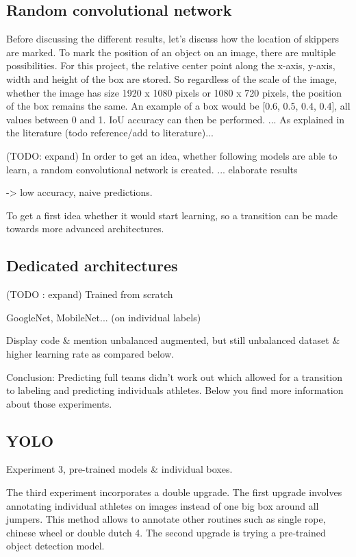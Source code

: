 \subsection{Random convolutional network}


Before discussing the different results, let's discuss how the location of skippers are marked. To mark the position of an object on an image, there are multiple possibilities.
For this project, the relative center point along the x-axis, y-axis, width and height of the box are stored. So regardless of the scale of the image, whether the image has size 1920 x 1080 pixels or 1080 x 720 pixels, the position of the box remains the same.
An example of a box would be [0.6, 0.5, 0.4, 0.4], all values between 0 and 1. IoU accuracy can then be performed.
... As explained in the literature (todo reference/add to literature)...

(TODO: expand)
In order to get an idea, whether following models are able to learn, a random convolutional network is created.
... elaborate results %

-> low accuracy, naive predictions.

To get a first idea whether it would start learning, so a transition can be made towards more advanced architectures.

\subsection{Dedicated architectures}

(TODO : expand)
Trained from scratch

GoogleNet, MobileNet... (on individual labels)

Display code \& mention unbalanced augmented, but still unbalanced dataset \& higher learning rate as compared below.

Conclusion:
Predicting full teams didn't work out which allowed for a transition to labeling and predicting individuals athletes. Below you find more information about those experiments.

\subsection{YOLO}

Experiment 3, pre-trained models \& individual boxes.

The third experiment incorporates a double upgrade. The first upgrade involves annotating individual athletes on images instead of one big box around all jumpers. This method allows to annotate other routines such as single rope, chinese wheel or double dutch 4. The second upgrade is trying a pre-trained object detection model.

